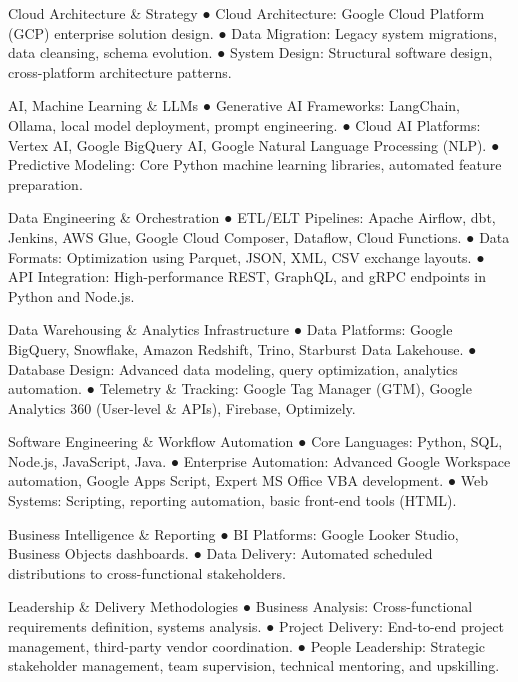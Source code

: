 

\begin{cvskillsnoncentered}

  \cvskill
  {Cloud Architecture \& Strategy}
  {● Cloud Architecture: Google Cloud Platform (GCP) enterprise solution design. ● Data Migration: Legacy system migrations, data cleansing, schema evolution. ● System Design: Structural software design, cross-platform architecture patterns.}

  \cvskill
  {AI, Machine Learning \& LLMs}
  {● Generative AI Frameworks: LangChain, Ollama, local model deployment, prompt engineering. ● Cloud AI Platforms: Vertex AI, Google BigQuery AI, Google Natural Language Processing (NLP). ● Predictive Modeling: Core Python machine learning libraries, automated feature preparation.}

  \cvskill
  {Data Engineering \& Orchestration}
  {● ETL/ELT Pipelines: Apache Airflow, dbt, Jenkins, AWS Glue, Google Cloud Composer, Dataflow, Cloud Functions. ● Data Formats: Optimization using Parquet, JSON, XML, CSV exchange layouts. ● API Integration: High-performance REST, GraphQL, and gRPC endpoints in Python and Node.js.}

  \cvskill
  {Data Warehousing \& Analytics Infrastructure}
  {● Data Platforms: Google BigQuery, Snowflake, Amazon Redshift, Trino, Starburst Data Lakehouse. ● Database Design: Advanced data modeling, query optimization, analytics automation. ● Telemetry \& Tracking: Google Tag Manager (GTM), Google Analytics 360 (User-level \& APIs), Firebase, Optimizely.}

  \cvskill
  {Software Engineering \& Workflow Automation}
  {● Core Languages: Python, SQL, Node.js, JavaScript, Java. ● Enterprise Automation: Advanced Google Workspace automation, Google Apps Script, Expert MS Office VBA development. ● Web Systems: Scripting, reporting automation, basic front-end tools (HTML).}

  \cvskill
  {Business Intelligence \& Reporting}
  {● BI Platforms: Google Looker Studio, Business Objects dashboards. ● Data Delivery: Automated scheduled distributions to cross-functional stakeholders.}

  \cvskill
  {Leadership \& Delivery Methodologies}
  {● Business Analysis: Cross-functional requirements definition, systems analysis. ● Project Delivery: End-to-end project management, third-party vendor coordination. ● People Leadership: Strategic stakeholder management, team supervision, technical mentoring, and upskilling.}
\end{cvskillsnoncentered}
